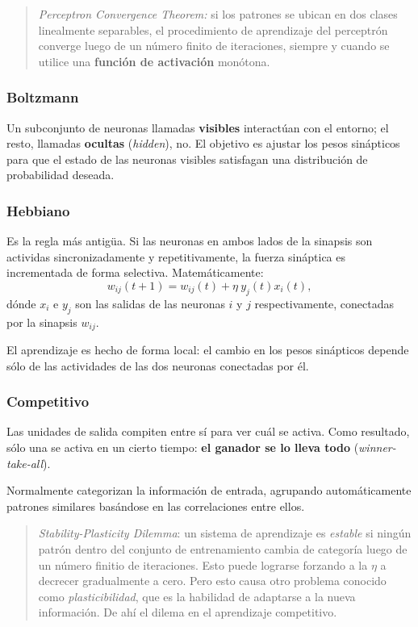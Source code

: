 \documentclass[10pt,a4paper]{article}
\begin{document}
\begin{quotation}
\textit{Perceptron Convergence Theorem:} si los patrones se ubican en dos clases linealmente separables, el procedimiento de aprendizaje del perceptrón converge luego de un número finito de iteraciones, siempre y cuando se utilice una \textbf{función de activación} monótona.
\end{quotation}

\subsubsection{Boltzmann}
Un subconjunto de neuronas llamadas \textbf{visibles} interactúan con el entorno; el resto, llamadas \textbf{ocultas} (\textit{hidden}), no. El objetivo es ajustar los pesos sinápticos para que el estado de las neuronas visibles satisfagan una distribución de probabilidad deseada.

\subsubsection{Hebbiano}
Es la regla más antigüa. Si las neuronas en ambos lados de la sinapsis son actividas sincronizadamente y repetitivamente, la fuerza sináptica es incrementada de forma selectiva. Matemáticamente:
\[w_{ij}(t+1) = w_{ij}(t) + \eta \: y_j(t)x_i(t),\]
dónde $x_i$ e $y_j$ son las salidas de las neuronas $i$ y $j$ respectivamente, conectadas por la sinapsis $w_{ij}$.

El aprendizaje es hecho de forma local: el cambio en los pesos sinápticos depende sólo de las actividades de las dos neuronas conectadas por él.

\subsubsection{Competitivo}
Las unidades de salida compiten entre sí para ver cuál se activa. Como resultado, sólo una se activa en un cierto tiempo: \textbf{el ganador se lo lleva todo} (\textit{winner-take-all}). 

Normalmente categorizan la información de entrada, agrupando automáticamente patrones similares basándose en las correlaciones entre ellos.

\begin{quotation}
\textit{Stability-Plasticity Dilemma}: un sistema de aprendizaje es \textit{estable} si ningún patrón dentro del conjunto de entrenamiento cambia de categoría luego de un número finitio de iteraciones. Esto puede lograrse forzando a la $\eta$ a decrecer gradualmente a cero. Pero esto causa otro problema conocido como \textit{plasticibilidad}, que es la habilidad de adaptarse a la nueva información. De ahí el dilema en el aprendizaje competitivo.
\end{quotation}
\end{document}
